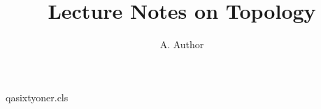 \begin{filecontents*}[overwrite]{qasixtyoner.cls}
\newcommand\course[1]{\gdef\@course{#1}}
\newcommand\term[1]{\gdef\@term{#1}}
\renewcommand\maketitle{\begin{center}{\LARGE \@title \par}
  {\large Course: \@course \par}{\large Term: \@term \par}{\large \@author \par}\end{center}\par}
\end{filecontents*}
\documentclass{qasixtyoner}
\title{Lecture Notes on Topology}
\author{A. Author}

\maketitle
Text.

